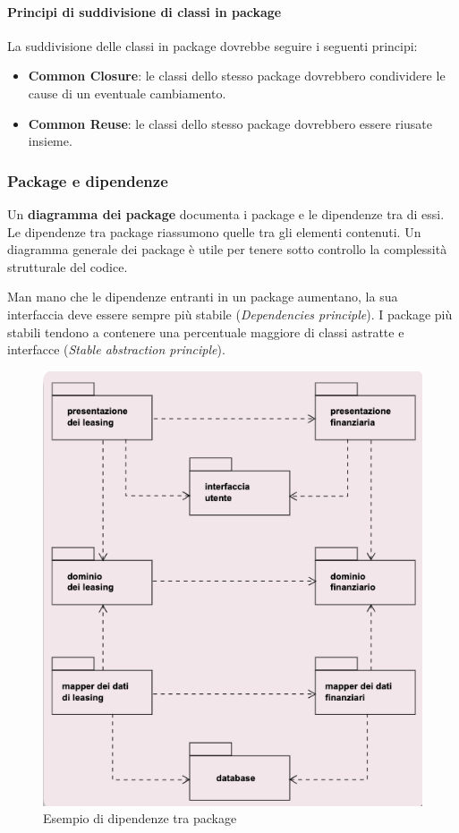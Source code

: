 \paragraph{Principi di suddivisione di classi in package}
La suddivisione delle classi in package dovrebbe seguire i seguenti principi:
\begin{itemize}
    \item \textbf{Common Closure}: le classi dello stesso package dovrebbero condividere le cause di un eventuale cambiamento.
    \item \textbf{Common Reuse}: le classi dello stesso package dovrebbero essere riusate insieme.
\end{itemize}

\subsubsection{Package e dipendenze}
Un \textbf{diagramma dei package} documenta i package e le dipendenze tra di essi. Le dipendenze tra package riassumono quelle tra gli elementi contenuti. Un diagramma generale dei package è utile per tenere sotto controllo la complessità strutturale del codice.

Man mano che le dipendenze entranti in un package aumentano, la sua interfaccia deve essere sempre più stabile (\textit{Dependencies principle}). I package più stabili tendono a contenere una percentuale maggiore di classi astratte e interfacce (\textit{Stable abstraction principle}).

\begin{figure}[H]
    \centering
    \includegraphics[width=0.75\linewidth]{assets/UML/package/package-2.png}
    \caption{Esempio di dipendenze tra package}
\end{figure}

